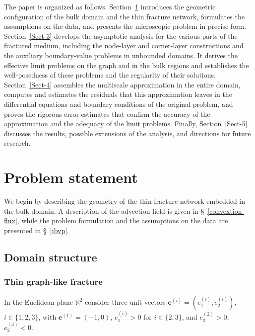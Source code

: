 \documentclass[reqno]{amsart}            %
\numberwithin{equation}{section}
\begin{document}
	
	
	The paper is organized as follows. Section~\ref{Sec-2} introduces the geometric configuration of the bulk domain and the thin fracture network, formulates the assumptions on the data, and presents the microscopic problem in precise form. Section~\ref{Sect-3} develops the asymptotic analysis for the various parts of the fractured medium, including the node-layer and corner-layer constructions and the auxiliary boundary-value problems in unbounded domains. It derives the effective limit problems on the graph and in the bulk regions and establishes the well-posedness of these problems and the regularity of their solutions. Section~\ref{Sect-4} assembles the multiscale approximation in the entire domain, computes and estimates the residuals that this approximation leaves in the differential equations and boundary conditions of the original problem, and proves the rigorous error estimates that confirm the accuracy of the approximation and the adequacy of the limit problems. Finally, Section~\ref{Sect-5} discusses the results, possible extensions of the analysis, and directions for future research.
	
	
	
	
	\section{Problem statement}\label{Sec-2}
	
	We begin by describing the geometry of the thin fracture network embedded in the bulk
	domain. A description of the advection field is given in \S~\ref{convextion-flux}, while the
	problem formulation and the assumptions on the data are presented in \S~\ref{ibvp}.
	
	\subsection{Domain structure}\label{subsec-1-1}
	
	\subsubsection*{Thin graph-like fracture}\label{domain}
	
	In the Euclidean plane $\mathbb{R}^2$ consider three unit vectors
	$\mathbf{e}^{(i)}=(e_1^{(i)},e_2^{(i)})$, $i\in\{1,2,3\}$,
	with $\mathbf{e}^{(1)}=(-1,0)$, $e_1^{(i)}>0$ for $i\in\{2,3\}$, and
	$e_2^{(2)}>0$, $e_2^{(3)}<0$.
	
\end{document}
